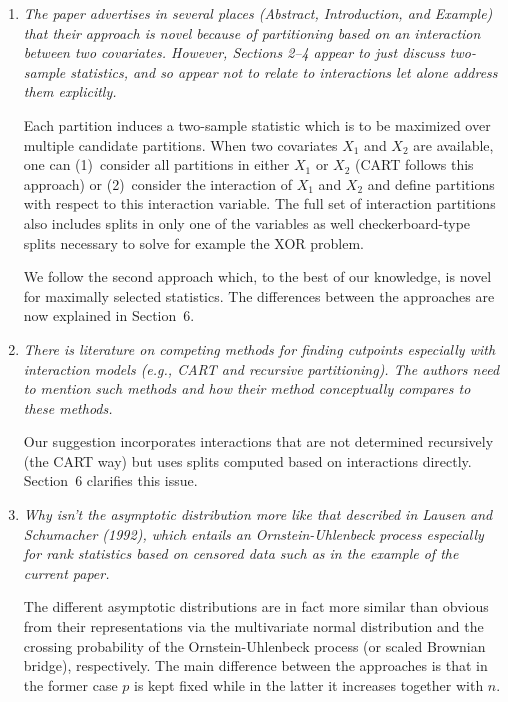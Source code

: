 \documentclass[11pt,a4paper]{article}
\begin{document}
\begin{enumerate}

  \item \textit{The paper advertises in several places (Abstract,
        Introduction, and Example) that their approach is novel because
	of partitioning based on an interaction between two covariates.
	However, Sections 2--4 appear to just discuss two-sample statistics,
	and so appear not to relate to interactions let alone address them
	explicitly.}
	
        Each partition induces a two-sample statistic which is to be maximized
        over multiple candidate partitions. When two covariates $X_1$ and $X_2$ are available,
        one can (1)~consider all partitions in either $X_1$ or $X_2$ (CART follows
        this approach) or (2)~consider the interaction of $X_1$ and $X_2$ 
        and define partitions with respect to this interaction variable. The full set
	of interaction partitions also includes splits in only one of the variables
        as well checkerboard-type splits necessary to solve for example the XOR problem.

        We follow the second approach which, to the best of our knowledge, is novel
	for maximally selected statistics.
        The differences between the approaches are now explained in Section~6.
	
  \item \textit{There is literature on competing methods for finding cutpoints
        especially with interaction models (e.g., CART and recursive partitioning).
	The authors need to mention such methods and how their method conceptually
	compares to these methods.}
	
	Our suggestion incorporates interactions that 
        are not determined recursively (the CART way) but uses splits computed based on 
	interactions directly. Section~6 clarifies this issue.

  \item \textit{Why isn't the asymptotic distribution more like that described
        in Lausen and Schumacher (1992), which entails an Ornstein-Uhlenbeck process
	especially for rank statistics based on censored data such as in the example
	of the current paper.}
	
        The different asymptotic distributions are in fact more similar than obvious
	from their representations via the multivariate normal distribution and the
	crossing probability of the Ornstein-Uhlenbeck process (or scaled Brownian
	bridge), respectively. The main difference between the approaches is that
	in the former case $p$ is kept fixed while in the latter it increases
	together with $n$.
	

\end{enumerate}
\end{document}
